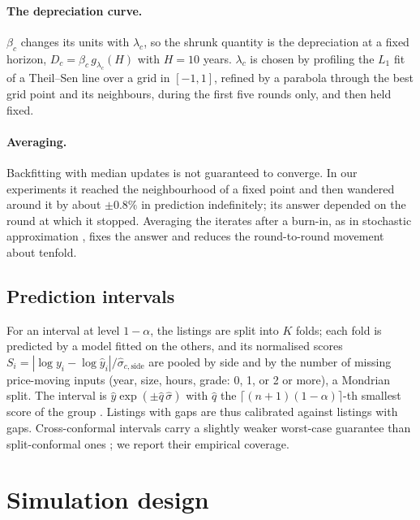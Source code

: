 \documentclass[11pt]{article}
\begin{document}
\paragraph{The depreciation curve.}
$\beta_c$ changes its units with $\lambda_c$, so the shrunk quantity is the depreciation at a fixed
horizon, $D_c=\beta_c\,g_{\lambda_c}(H)$ with $H=10$ years. $\lambda_c$ is chosen by profiling the
$L_1$ fit of a Theil--Sen line over a grid in $[-1,1]$, refined by a parabola through the best
grid point and its neighbours, during the first five rounds only, and then held fixed.

\paragraph{Averaging.}
Backfitting with median updates is not guaranteed to converge. In our experiments it reached the
neighbourhood of a fixed point and then wandered around it by about $\pm0.8\%$ in prediction
indefinitely; its answer depended on the round at which it stopped. Averaging the iterates after a
burn-in, as in stochastic approximation \citep{polyak1992}, fixes the answer and reduces the
round-to-round movement about tenfold.

\subsection{Prediction intervals}
\label{sec:intervals}
For an interval at level $1-\alpha$, the listings are split into $K$ folds; each fold is predicted
by a model fitted on the others, and its normalised scores
$S_i = |\log y_i - \log\hat y_i| / \hat\sigma_{c,\text{side}}$ are pooled by side and by the number of
missing price-moving inputs (year, size, hours, grade: 0, 1, or 2 or more), a Mondrian split. The
interval is $\hat y\exp(\pm\hat q\,\hat\sigma)$ with $\hat q$ the $\lceil(n+1)(1-\alpha)\rceil$-th
smallest score of the group \citep{vovk2005,lei2018}. Listings with gaps are thus calibrated against
listings with gaps. Cross-conformal intervals carry a slightly weaker worst-case guarantee than
split-conformal ones \citep{barber2021}; we report their empirical coverage.

\section{Simulation design}
\label{sec:design}
\end{document}
